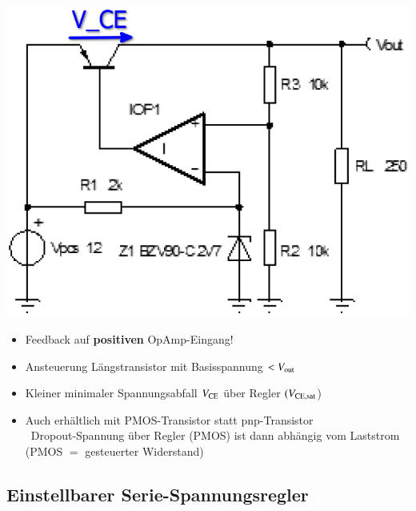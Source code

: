 \begin{minipage}[c]{0.25\columnwidth}
    \includegraphics[width=\columnwidth]{images/ldo_pnp_transistor.png}
\end{minipage}
\hfill
\begin{minipage}[c]{0.74\columnwidth}
    \begin{itemize}
        \item Feedback auf \textbf{positiven} OpAmp-Eingang!
        \item Ansteuerung Längstransistor mit Basisspannung $< V_{\rm out}$
        \item Kleiner minimaler Spannungsabfall $V_{\rm CE}$ über Regler $(V_{\rm CE,sat}$)
        \item Auch erhältlich mit PMOS-Transistor statt pnp-Transistor\\
            \textrightarrow\ Dropout-Spannung über Regler (PMOS) ist dann 
            abhängig vom Laststrom (PMOS $=$ gesteuerter Widerstand)
    \end{itemize}
\end{minipage}


\subsection{Einstellbarer Serie-Spannungsregler}

